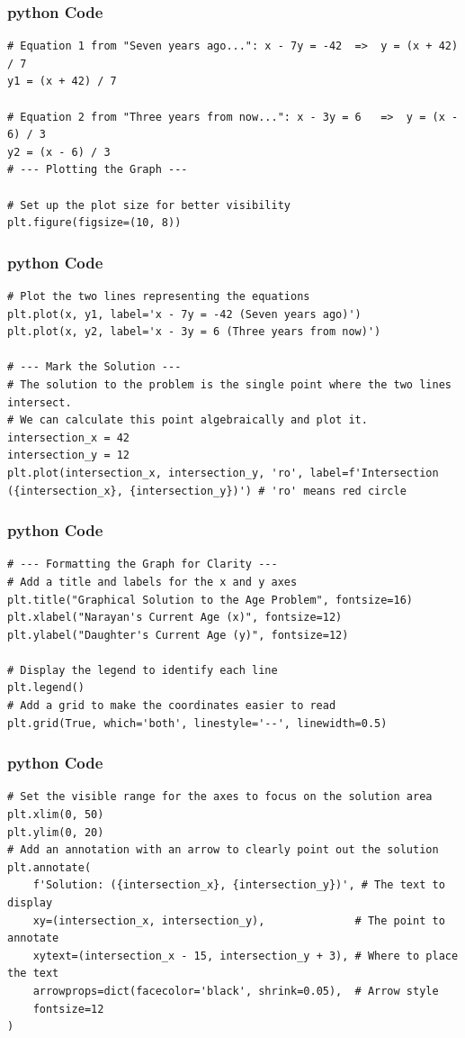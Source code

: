 \documentclass{beamer}
\begin{document}
\begin{frame}[fragile]
\frametitle{python Code}
\begin{lstlisting}
# Equation 1 from "Seven years ago...": x - 7y = -42  =>  y = (x + 42) / 7
y1 = (x + 42) / 7

# Equation 2 from "Three years from now...": x - 3y = 6   =>  y = (x - 6) / 3
y2 = (x - 6) / 3
# --- Plotting the Graph ---

# Set up the plot size for better visibility
plt.figure(figsize=(10, 8))
\end{lstlisting}
\end{frame}

\begin{frame}[fragile]
\frametitle{python Code}
\begin{lstlisting}
# Plot the two lines representing the equations
plt.plot(x, y1, label='x - 7y = -42 (Seven years ago)')
plt.plot(x, y2, label='x - 3y = 6 (Three years from now)')

# --- Mark the Solution ---
# The solution to the problem is the single point where the two lines intersect.
# We can calculate this point algebraically and plot it.
intersection_x = 42
intersection_y = 12
plt.plot(intersection_x, intersection_y, 'ro', label=f'Intersection ({intersection_x}, {intersection_y})') # 'ro' means red circle
\end{lstlisting}
\end{frame}

\begin{frame}[fragile]
\frametitle{python Code}
\begin{lstlisting}
# --- Formatting the Graph for Clarity ---
# Add a title and labels for the x and y axes
plt.title("Graphical Solution to the Age Problem", fontsize=16)
plt.xlabel("Narayan's Current Age (x)", fontsize=12)
plt.ylabel("Daughter's Current Age (y)", fontsize=12)

# Display the legend to identify each line
plt.legend()
# Add a grid to make the coordinates easier to read
plt.grid(True, which='both', linestyle='--', linewidth=0.5)
\end{lstlisting}
\end{frame}

\begin{frame}[fragile]
\frametitle{python Code}
\begin{lstlisting}
# Set the visible range for the axes to focus on the solution area
plt.xlim(0, 50)
plt.ylim(0, 20)
# Add an annotation with an arrow to clearly point out the solution
plt.annotate(
    f'Solution: ({intersection_x}, {intersection_y})', # The text to display
    xy=(intersection_x, intersection_y),              # The point to annotate
    xytext=(intersection_x - 15, intersection_y + 3), # Where to place the text
    arrowprops=dict(facecolor='black', shrink=0.05),  # Arrow style
    fontsize=12
)
\end{lstlisting}
\end{frame}
\end{document}
